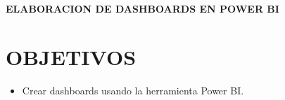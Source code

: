 \documentclass[12pt,letterpaper]{article}
\begin{document}
    \newpage
    \begin{LARGE}
        \begin{center}
            \textbf{ELABORACION DE DASHBOARDS EN POWER BI}\\
        \end{center}
    \end{LARGE}
    \section{OBJETIVOS}
    \begin{itemize}
        \item Crear dashboards usando la herramienta Power BI.
    \end{itemize}
\end{document}
